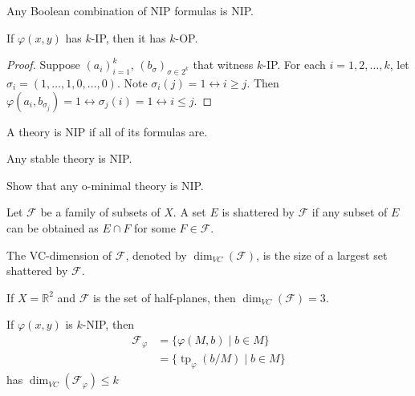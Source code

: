 \documentclass{article}
\DeclareMathOperator{\tp}{tp}
\begin{document}
\begin{ex}
  Any Boolean combination of NIP formulas is NIP.
\end{ex}
\begin{lemma}
  If $\varphi(x,y)$ has $k$-IP, then it has $k$-OP.
\end{lemma}
\begin{proof}
  Suppose $(a_i)_{i=1}^k$, $(b_\sigma)_{\sigma \in 2^k}$ that witness $k$-IP.
  For each $i=1, 2,\dotsc,k$, let $\sigma_i=(1,\dotsc,1,0,\dotsc,0)$. Note $\sigma_i(j) = 1 \leftrightarrow i \geq j$.
  Then $\varphi(a_i, b_{\sigma_j}) = 1 \leftrightarrow \sigma_j(i) = 1 \leftrightarrow i \leq j$.
\end{proof}
\begin{defi}
  A theory is NIP if all of its formulas are.
\end{defi}
\begin{eg}
  Any stable theory is NIP.
\end{eg}
\begin{ex}
  Show that any o-minimal theory is NIP.
\end{ex}
\begin{defi}
  Let $\mathcal{F}$ be a family of subsets of $X$. A set $E$ is shattered by $\mathcal{F}$ if any subset of $E$ can be obtained as $E \cap F$ for some $F \in \mathcal{F}$.

  The VC-dimension of $\mathcal{F}$, denoted by $\dim_{VC}(\mathcal{F})$, is the size of a largest set shattered by $\mathcal{F}$.
\end{defi}
\begin{eg}
  If $X = \mathbb{R}^2$ and $\mathcal{F}$ is the set of half-planes, then $\dim_{VC}(\mathcal{F}) = 3$.
\end{eg}

If $\varphi(x,y)$ is $k$-NIP, then
\begin{align*}
  \mathcal{F}_\varphi &= \{\varphi(M,b) \mid b \in M\}   \\
                      &= \{\tp_\varphi(b/M) \mid b \in M\}
\end{align*}
has $\dim_{VC}(\mathcal{F}_\varphi)\leq k$
\end{document}
